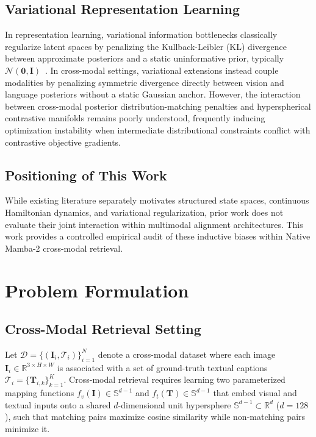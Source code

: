\documentclass[conference]{IEEEtran}
\begin{document}
\subsection{Variational Representation Learning}
In representation learning, variational information bottlenecks classically regularize latent spaces by penalizing the Kullback-Leibler (KL) divergence between approximate posteriors and a static uninformative prior, typically $\mathcal{N}(\mathbf{0}, \mathbf{I})$~\cite{kingma2014auto,alemi2017deep}. In cross-modal settings, variational extensions instead couple modalities by penalizing symmetric divergence directly between vision and language posteriors without a static Gaussian anchor. However, the interaction between cross-modal posterior distribution-matching penalties and hyperspherical contrastive manifolds remains poorly understood, frequently inducing optimization instability when intermediate distributional constraints conflict with contrastive objective gradients.

\subsection{Positioning of This Work}
While existing literature separately motivates structured state spaces, continuous Hamiltonian dynamics, and variational regularization, prior work does not evaluate their joint interaction within multimodal alignment architectures. This work provides a controlled empirical audit of these inductive biases within Native Mamba-2 cross-modal retrieval.

\section{Problem Formulation}
\label{sec:formulation}

\subsection{Cross-Modal Retrieval Setting}
Let $\mathcal{D} = \{(\mathbf{I}_i, \mathcal{T}_i)\}_{i=1}^N$ denote a cross-modal dataset where each image $\mathbf{I}_i \in \mathbb{R}^{3 \times H \times W}$ is associated with a set of ground-truth textual captions $\mathcal{T}_i = \{\mathbf{T}_{i, k}\}_{k=1}^{K}$. Cross-modal retrieval requires learning two parameterized mapping functions $f_v(\mathbf{I}) \in \mathbb{S}^{d-1}$ and $f_t(\mathbf{T}) \in \mathbb{S}^{d-1}$ that embed visual and textual inputs onto a shared $d$-dimensional unit hypersphere $\mathbb{S}^{d-1} \subset \mathbb{R}^d$ ($d=128$), such that matching pairs maximize cosine similarity while non-matching pairs minimize it.
\end{document}
